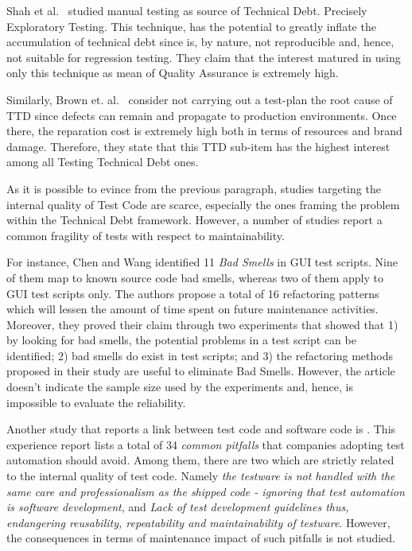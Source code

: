 Shah et al.\ \cite{exploratorying_testing_td} studied manual testing as source of Technical Debt. Precisely Exploratory Testing. This technique, has the potential to greatly inflate the accumulation of technical debt since is, by nature, not reproducible and, hence, not suitable for regression testing. They claim that the interest matured in using only this technique as mean of Quality Assurance is extremely high. 

Similarly, Brown et. al.\ \cite{td_current_vs_optimal_quality} consider not carrying out a test-plan the root cause of TTD since defects can remain and propagate to production environments. Once there, the reparation cost is extremely high both in terms of resources and brand damage. Therefore, they state that this TTD sub-item has the highest interest among all Testing Technical Debt ones.

As it is possible to evince from the previous paragraph, studies targeting the internal quality of Test Code are scarce, especially the ones framing the problem within the Technical Debt framework. However, a number of studies report a common fragility of tests with respect to maintainability. 

For instance, Chen and Wang \cite{gui_scripts_bad_smells} identified 11 \textit{Bad Smells} in GUI test scripts. Nine of them map to known source code bad smells, whereas two of them apply to GUI test scripts only. The authors propose a total of 16 refactoring patterns which will lessen the amount of time spent on future maintenance activities. Moreover, they proved their claim through two experiments that showed that 1) by looking for bad smells, the potential problems in a test script can be identified; 2) bad smells do exist in test scripts; and 3) the refactoring methods proposed in their study are useful to eliminate Bad Smells. However, the article doesn't indicate the sample size used by the experiments and, hence, is impossible to evaluate the reliability. 

Another study that reports a link between test code and software code is \cite{pitfalls_in_introducing_regression_testing}. This experience report lists a total of 34 \textit{common pitfalls} that companies adopting test automation should avoid. Among them, there are two which are strictly related to the internal quality of test code. Namely \textit{the testware is not handled with the same care and professionalism as the shipped code - ignoring that test automation is software development}, and \textit{Lack of test development guidelines thus, endangering reusability, repeatability and maintainability of testware}. However, the consequences in terms of maintenance impact of such pitfalls is not studied. 

